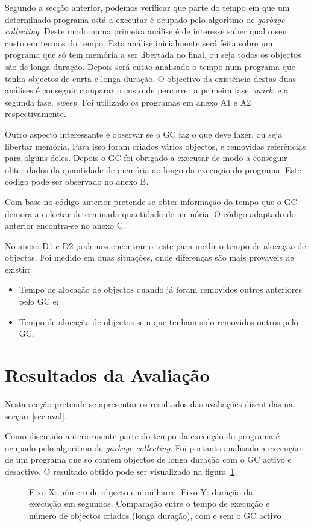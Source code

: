 \documentclass{article}
\begin{document}
Segundo a secção anterior, podemos verificar que parte do tempo em que um determinado programa está a executar é ocupado pelo algoritmo de \emph{garbage collecting}. Deste modo numa primeira análise é de interesse saber qual o seu custo em termos do tempo.
Esta análise inicialmente será feita sobre um programa que só tem memória a ser libertada no final, ou seja todos os objectos são de longa duração. Depois será então analisado o tempo num programa que tenha objectos de curta e longa duração. O objectivo da existência destas duas análises é conseguir comparar o custo de percorrer a primeira fase, \emph{mark}, e a segunda fase, \emph{sweep}. Foi utilizado os programas em anexo A1 e A2 respectivamente.

Outro aspecto interessante é observar se o GC faz o que deve fazer, ou seja libertar memória. Para isso foram criados vários objectos, e removidas referências para alguns deles. Depois o GC foi obrigado a executar de modo a conseguir obter dados da quantidade de memória ao longo da execução do programa. Este código pode ser observado no anexo B.

Com base no código anterior pretende-se obter informação do tempo que o GC demora a colectar determinada quantidade de memória. O código adaptado do anterior encontra-se no anexo C.

No anexo D1 e D2 podemos encontrar o teste para medir o tempo de alocação de objectos. Foi medido em duas situações, onde diferenças são mais provaveis de existir:
\begin{itemize}
\item Tempo de alocação de objectos quando já foram removidos outros anteriores pelo GC e;
\item Tempo de alocação de objectos sem que tenham sido removidos outros pelo GC.
\end{itemize}

%
\section{Resultados da Avaliação}
\label{sec:res}
%
Nesta secção pretende-se apresentar os resultados das avaliações discutidas na secção~\ref{sec:aval}.

Como discutido anteriormente parte do tempo da execução do programa é ocupado pelo algoritmo de \emph{garbage collecting}.
Foi portanto analisado a execução de um programa que só contem objectos de longa duração com o GC activo e desactivo. O resultado obtido pode ser visualizado na figura~\ref{graph:graph1}. 
\begin{figure}[h!]
  \begin{center}
    
    \caption{Eixo X: número de objecto em milhares. Eixo Y: duração da execução em segundos. Comparação entre o tempo de execução e número de objectos criados (longa duração), com  e sem o  GC activo}
    \label{graph:graph1}
  \end{center}
\end{figure}
\end{document}
